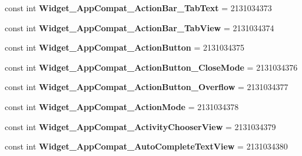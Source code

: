 \begin{DoxyCompactItemize}
\item 
\hypertarget{classClient_1_1Droid_1_1Resource_1_1Style_addc8dd2e09fba3da16a3c37f4764c729}{}const int {\bfseries Widget\+\_\+\+App\+Compat\+\_\+\+Action\+Bar\+\_\+\+Tab\+Text} = 2131034373\label{classClient_1_1Droid_1_1Resource_1_1Style_addc8dd2e09fba3da16a3c37f4764c729}

\item 
\hypertarget{classClient_1_1Droid_1_1Resource_1_1Style_a7e106ad0abcb782c90df13b15e384172}{}const int {\bfseries Widget\+\_\+\+App\+Compat\+\_\+\+Action\+Bar\+\_\+\+Tab\+View} = 2131034374\label{classClient_1_1Droid_1_1Resource_1_1Style_a7e106ad0abcb782c90df13b15e384172}

\item 
\hypertarget{classClient_1_1Droid_1_1Resource_1_1Style_ae62d0bb241e4d98a7f4cca2111d0e179}{}const int {\bfseries Widget\+\_\+\+App\+Compat\+\_\+\+Action\+Button} = 2131034375\label{classClient_1_1Droid_1_1Resource_1_1Style_ae62d0bb241e4d98a7f4cca2111d0e179}

\item 
\hypertarget{classClient_1_1Droid_1_1Resource_1_1Style_ad8b948a2a83d423855bf1f47b73256d5}{}const int {\bfseries Widget\+\_\+\+App\+Compat\+\_\+\+Action\+Button\+\_\+\+Close\+Mode} = 2131034376\label{classClient_1_1Droid_1_1Resource_1_1Style_ad8b948a2a83d423855bf1f47b73256d5}

\item 
\hypertarget{classClient_1_1Droid_1_1Resource_1_1Style_ab655c429e970b2c63aaef7fabb6055b9}{}const int {\bfseries Widget\+\_\+\+App\+Compat\+\_\+\+Action\+Button\+\_\+\+Overflow} = 2131034377\label{classClient_1_1Droid_1_1Resource_1_1Style_ab655c429e970b2c63aaef7fabb6055b9}

\item 
\hypertarget{classClient_1_1Droid_1_1Resource_1_1Style_a5375a22976e600f0b16cca803df63a90}{}const int {\bfseries Widget\+\_\+\+App\+Compat\+\_\+\+Action\+Mode} = 2131034378\label{classClient_1_1Droid_1_1Resource_1_1Style_a5375a22976e600f0b16cca803df63a90}

\item 
\hypertarget{classClient_1_1Droid_1_1Resource_1_1Style_a2dd0150b948f570822c1cf749ec6f289}{}const int {\bfseries Widget\+\_\+\+App\+Compat\+\_\+\+Activity\+Chooser\+View} = 2131034379\label{classClient_1_1Droid_1_1Resource_1_1Style_a2dd0150b948f570822c1cf749ec6f289}

\item 
\hypertarget{classClient_1_1Droid_1_1Resource_1_1Style_a2a618aed51c0c64e36e663ee7d6f736a}{}const int {\bfseries Widget\+\_\+\+App\+Compat\+\_\+\+Auto\+Complete\+Text\+View} = 2131034380\label{classClient_1_1Droid_1_1Resource_1_1Style_a2a618aed51c0c64e36e663ee7d6f736a}


\end{DoxyCompactItemize}
